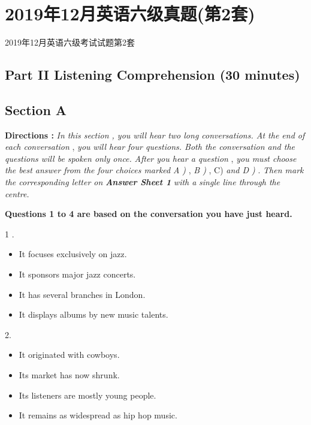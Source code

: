 \documentclass[UTF8,11pt]{ctexart}
\begin{document}
\section*{2019年12月英语六级真题(第2套)}
2019年12月英语六级考试试题第2套


\subsection*{\textbf{Part II} \textbf{Listening Comprehension} \textbf{(30 minutes)}}


\subsection*{\textbf{Section A}}


\textbf{Directions : }\textit{In this section , you will hear two long conversations. At the end of each conversation }, \textit{you} \textit{will hear four questions. Both the conversation and the questions will be spoken only once.} \textit{After you hear a question }, \textit{you must choose the best answer from the four choices marked} \textit{A ) }, \textit{B ) }, C) \textit{and D ) }. \textit{Then mark the corresponding letter on }\textbf{\textit{Answer Sheet 1 }}\textit{with a} \textit{single line through the centre.}


\textbf{Questions 1 to 4 are based on the conversation you have just heard.}


1 .


\begin{itemize}[leftmargin=2em,itemsep=.2em,topsep=.4em]\item[A.] It focuses exclusively on jazz.
\item[B.] It sponsors major jazz concerts.
\item[C.] It has several branches in London.
\item[D.] It displays albums by new music talents.
\end{itemize}

2.


\begin{itemize}[leftmargin=2em,itemsep=.2em,topsep=.4em]\item[A.] It originated with cowboys.
\item[B.] Its market has now shrunk.
\item[C.] Its listeners are mostly young people.
\item[D.] It remains as widespread as hip hop music.
\end{itemize}
\end{document}
